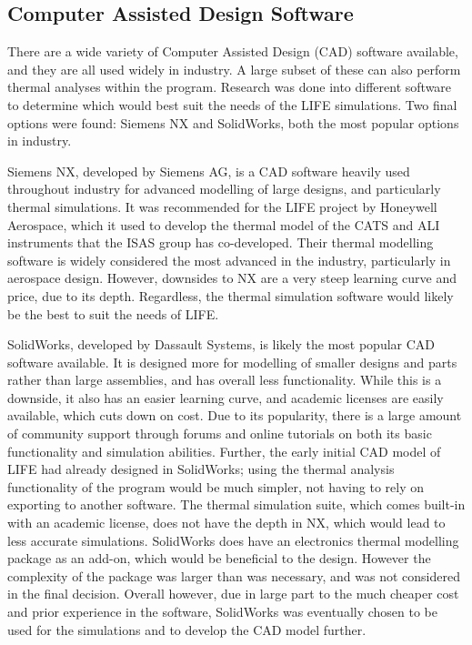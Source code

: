 \subsection{Computer Assisted Design Software}
There are a wide variety of Computer Assisted Design (CAD) software available, and they are all used widely in industry. A large subset of these can also perform thermal analyses within the program. Research was done into different software to determine which would best suit the needs of the LIFE simulations. Two final options were found: Siemens NX and SolidWorks, both the most popular options in industry.

Siemens NX, developed by Siemens AG, is a CAD software heavily used throughout industry for advanced modelling of large designs, and particularly thermal simulations. It was recommended for the LIFE project by Honeywell Aerospace, which it used to develop the thermal model of the CATS and ALI instruments that the ISAS group has co-developed. Their thermal modelling software is widely considered the most advanced in the industry, particularly in aerospace design. However, downsides to NX are a very steep learning curve and price, due to its depth. Regardless, the thermal simulation software would likely be the best to suit the needs of LIFE.

SolidWorks, developed by Dassault Systems, is likely the most popular CAD software available. It is designed more for modelling of smaller designs and parts rather than large assemblies, and has overall less functionality. While this is a downside, it also has an easier learning curve, and academic licenses are easily available, which cuts down on cost. Due to its popularity, there is a large amount of community support through forums and online tutorials on both its basic functionality and simulation abilities. Further, the early initial CAD model of LIFE had already designed in SolidWorks; using the thermal analysis functionality of the program would be much simpler, not having to rely on exporting to another software. The thermal simulation suite, which comes built-in with an academic license, does not have the depth in NX, which would lead to less accurate simulations. SolidWorks does have an electronics thermal modelling package as an add-on, which would be beneficial to the design. However the complexity of the package was larger than was necessary, and was not considered in the final decision. Overall however, due in large part to the much cheaper cost and prior experience in the software, SolidWorks was eventually chosen to be used for the simulations and to develop the CAD model further. 


